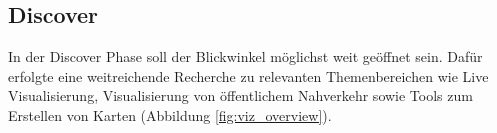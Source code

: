 \begin{newpage}
  \section{Discover}
  \label{sec:discover}
    In der Discover Phase soll der Blickwinkel möglichst weit geöffnet sein. 
    Dafür erfolgte eine weitreichende Recherche zu relevanten Themenbereichen wie Live Visualisierung, Visualisierung von öffentlichem Nahverkehr sowie Tools zum Erstellen von Karten (Abbildung \ref{fig:viz_overview}). 

    

    
\end{newpage}